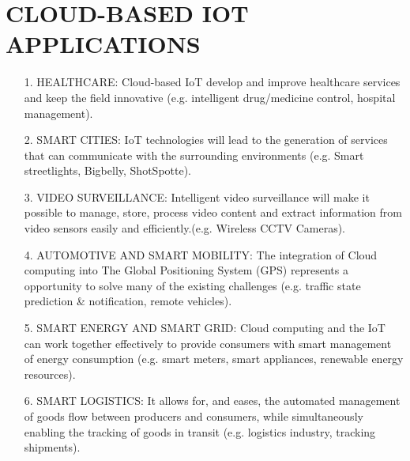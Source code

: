 \documentclass[11pt]{article}
\begin{document}
\section{CLOUD-BASED IOT APPLICATIONS}
\begin{itemize}
\item[1.]HEALTHCARE: Cloud-based IoT develop and improve healthcare services and keep the field innovative (e.g. intelligent drug/medicine control, hospital management).
\item[2.]SMART CITIES: IoT technologies  will lead
to the generation of services that can communicate
with the surrounding environments (e.g. Smart
streetlights, Bigbelly, ShotSpotte).
\item[3.]VIDEO SURVEILLANCE: Intelligent video
surveillance will make it possible to manage, store, process video content and extract information from video sensors
easily and efficiently.(e.g. Wireless CCTV
Cameras). 
\item[4.]AUTOMOTIVE AND SMART MOBILITY: The integration of Cloud computing into The Global Positioning System (GPS) represents a opportunity to solve many of the existing challenges (e.g. traffic state prediction & notification, remote vehicles).
\item[5.]SMART ENERGY AND SMART GRID: Cloud computing and the IoT can work together effectively to provide consumers with smart management of energy consumption (e.g. smart
meters, smart appliances, renewable energy resources). 
\item[6.]SMART LOGISTICS: It allows for, and eases, the automated management of goods flow between producers and consumers, while simultaneously enabling the tracking of
goods in transit (e.g. logistics industry, tracking
shipments).   
\end{itemize}
\end{document}
